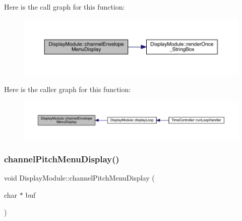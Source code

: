 Here is the call graph for this function\+:
\nopagebreak
\begin{figure}[H]
\begin{center}
\leavevmode
\includegraphics[width=350pt]{class_display_module_a61256f4c2a099fd0b0c59a5bba277914_cgraph}
\end{center}
\end{figure}
Here is the caller graph for this function\+:
\nopagebreak
\begin{figure}[H]
\begin{center}
\leavevmode
\includegraphics[width=350pt]{class_display_module_a61256f4c2a099fd0b0c59a5bba277914_icgraph}
\end{center}
\end{figure}
\mbox{\label{class_display_module_a61c9ecea836833a5460f2834a18eef05}} 
\subsubsection{\texorpdfstring{channel\+Pitch\+Menu\+Display()}{channelPitchMenuDisplay()}}
{\footnotesize\ttfamily void Display\+Module\+::channel\+Pitch\+Menu\+Display (\begin{DoxyParamCaption}\item[{char $\ast$}]{buf }\end{DoxyParamCaption})}


